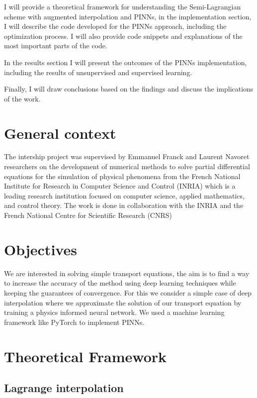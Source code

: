 \documentclass{article}
\begin{document}
I will provide a theoretical framework for understanding the Semi-Lagrangian scheme with augmented interpolation and PINNs, in the implementation section, I will describe the code developed for the PINNs approach, including the optimization process. I will also provide code snippets and explanations of the most important parts of the code.

In the results section I will present the outcomes of the PINNs implementation, including the results of unsupervised and supervised learning.

Finally, I will draw conclusions based on the findings and discuss the implications of the work.

\newpage

\section{General context}

The intership project was supervised by Emmanuel Franck and Laurent Navoret researchers on the development of numerical methods to solve partial differential equations for the simulation of physical phenomena from the French National Institute for Research in Computer Science and Control (INRIA) which is a leading research institution focused on computer science, applied mathematics, and control theory. 
The work is done in collaboration with the INRIA and the French National Centre for Scientific Research (CNRS)

\section{Objectives}

We are interested in solving simple transport equations, the aim is to find a way to increase the accuracy of the method using deep learning techniques while keeping the guarantees of convergence.
For this we consider a simple case of deep interpolation where we approximate the solution of our transport equation by training a physics informed neural network.
We used a machine learning framework like PyTorch to implement PINNs. 

\section{Theoretical Framework}

\subsection{Lagrange interpolation}
\end{document}
